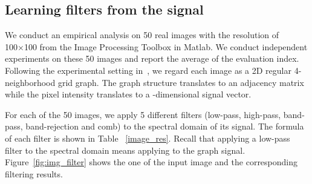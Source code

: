 \documentclass{article}
\begin{document}
\begin{table}[t]
\centering
\small
\caption{Average sum of squared error and  score in parentheses.}
\label{image_res}
\end{table}

\subsection{Learning filters from the signal}
We conduct an empirical analysis on 50 real images with the resolution of 100×100 from the Image Processing Toolbox in Matlab. 
We conduct independent experiments on these 50 images and report the average of the evaluation index.
Following the experimental setting in~\cite{balcilar2021analyzing}, we regard each image as a 2D regular 4-neighborhood grid graph. The graph structure translates to an  adjacency matrix while the pixel intensity translates to a -dimensional signal vector. 




For each of the 50 images, we apply 5 different filters (low-pass, high-pass, band-pass, band-rejection and comb) to the spectral domain of its signal. The formula of each filter is shown in Table ~\ref{image_res}. Recall that applying a low-pass filter  to the spectral domain  means applying 
 to the graph signal. 
Figure~\ref{fig:img_filter} shows the one of the input image and the corresponding filtering results.
\end{document}
